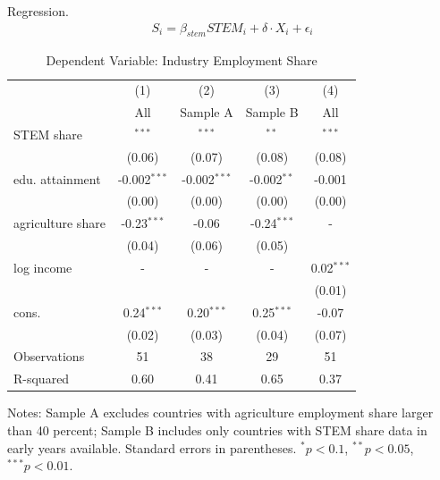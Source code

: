 \documentclass[9pt,xcolor={svgnames}]{beamer}
\begin{document}
\begin{frame}{Regression.  \hyperlink{main:scatterplot}{}
}\label{app:regression}
\vspace{-1em}
\begin{align*}\label{regression}
    S_i = \beta_{stem} STEM_i + \delta \cdot X_i + \epsilon_i
\end{align*}

\vspace{-1em}

\begin{table}[htbp]
\centering
\begin{threeparttable}
\caption{Dependent Variable: Industry Employment Share}
\begin{tabular}{lcccc}
\toprule
 & (1) & (2) & (3) & (4) \\
 & All &  Sample A & Sample B & All \\
\midrule
STEM share & \color{red}{0.26}$^{***}$ & \color{red}{0.29}$^{***}$ & \color{red}{0.19}$^{**}$  & \color{red}{0.29}$^{***}$ \\
          & (0.06)       & (0.07)      & (0.08)    &(0.08) \\
edu. attainment & -0.002$^{***}$ & -0.002$^{***}$ & -0.002$^{**}$ & -0.001 \\
          & (0.00)       & (0.00)       & (0.00)    & (0.00) \\
agriculture share & -0.23$^{***}$       & -0.06       & -0.24$^{***}$  & -    \\
          & (0.04)       & (0.06)       & (0.05)     \\
  log income & -       & -      &  - &  0.02$^{***}$    \\
          &        &       &   & (0.01)    \\        
cons. & 0.24$^{***}$       & 0.20$^{***}$        & 0.25$^{***}$  & -0.07     \\
          & (0.02)       & (0.03)       & (0.04)    & (0.07) \\ 
\midrule
Observations & 51 & 38 & 29 & 51 \\
R-squared    & 0.60 & 0.41 & 0.65 & 0.37 \\
\bottomrule
\end{tabular}
\begin{tablenotes}
\small
\item Notes: Sample A excludes countries with agriculture employment share larger than 40 percent; Sample B includes only countries with STEM share data in early years available.
Standard errors in parentheses. $^{*}p<0.1$, $^{**}p<0.05$, $^{***}p<0.01$.
\end{tablenotes}
\end{threeparttable}
\end{table}
\end{frame}
\end{document}
